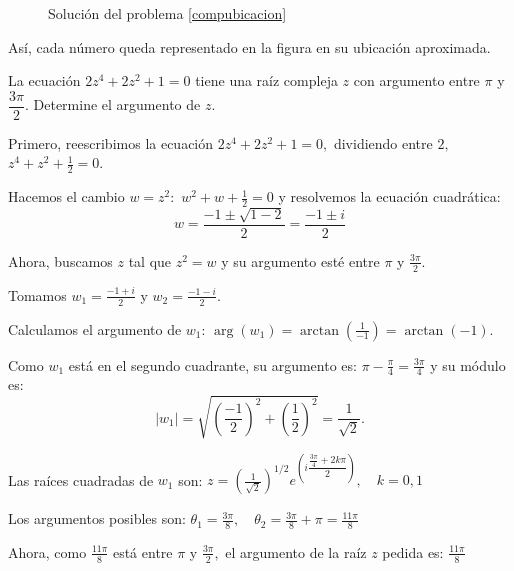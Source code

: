 \begin{prob}
\begin{myproof}
\begin{figure}[H]
\caption{Solución del problema \ref{compubicacion}}
\end{figure}

Así, cada número queda representado en la figura en su ubicación aproximada.
\end{myproof}

\end{prob}
	
\begin{prob} La ecuación $2z^4+2z^2+1=0$ tiene una raíz compleja $z$ con argumento entre $\pi$ y $\dfrac{3\pi}{2}$. Determine el argumento de $z$.
\begin{myproof}
Primero, reescribimos la ecuación \(2z^4 + 2z^2 + 1 = 0,\) dividiendo entre $2,$ \(
z^4 + z^2 + \frac{1}{2} = 0.\)


Hacemos el cambio $w = z^2:$ \(
w^2 + w + \frac{1}{2} = 0
\) y resolvemos la ecuación cuadrática:
\[
w = \frac{-1 \pm \sqrt{1 - 2}}{2} = \frac{-1 \pm i}{2}
\]

Ahora, buscamos $z$ tal que $z^2 = w$ y su argumento esté entre $\pi$ y $\frac{3\pi}{2}$.

Tomamos $w_1 = \frac{-1 + i}{2}$ y $w_2 = \frac{-1 - i}{2}$.

Calculamos el argumento de $w_1$: \(
\arg(w_1) = \arctan\left(\frac{1}{-1}\right) = \arctan(-1).\)


Como $w_1$ está en el segundo cuadrante, su argumento es: \(\pi - \frac{\pi}{4} = \frac{3\pi}{4} \) y su módulo es: \[|w_1| = \sqrt{\left(\frac{-1}{2}\right)^2 + \left(\frac{1}{2}\right)^2} = \frac{1}{\sqrt{2}}.\]

Las raíces cuadradas de $w_1$ son: \(
z = \left(\frac{1}{\sqrt{2}}\right)^{1/2} e^{\left(i \dfrac{\frac{3\pi}{4} + 2k\pi}{2}\right)}, \quad k=0,1
\)

Los argumentos posibles son: \(
\theta_1 = \frac{3\pi}{8}, \quad \theta_2 = \frac{3\pi}{8} + \pi = \frac{11\pi}{8}
\)

Ahora, como $\frac{11\pi}{8}$ está entre $\pi$ y $\frac{3\pi}{2},$  el argumento de la raíz $z$ pedida es: \(
\boxed{\frac{11\pi}{8}}
\)
\end{myproof}

\end{prob}		

